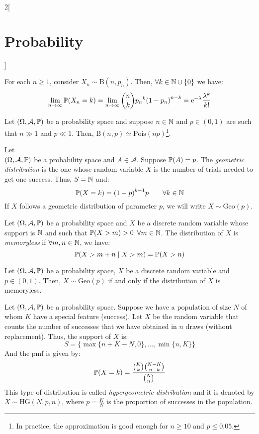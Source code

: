 \documentclass[../../../main.tex]{subfiles}
\begin{document}
\begin{multicols}{2}[\section{Probability}]
\begin{theorem}
    For each $n\geq 1$, consider $X_n\sim \text{B}(n,p_n)$. Then, $\forall k\in\mathbb{N}\cup\{0\}$ we have: $$\lim_{n\to\infty}\mathbb{P}(X_n=k)=\lim_{n\to\infty}\binom{n}{k}{p_n}^k{(1-p_n)}^{n-k}=\mathrm{e}^{-\lambda}\frac{\lambda^k}{k!}$$
  \end{theorem}
  \begin{corollary}
    Let $(\Omega,\mathcal{A},\mathbb{P})$ be a probability space and suppose $n\in\mathbb{N}$ and $p\in (0,1)$ are such that $n\gg 1$ and $p\ll 1$. Then, $\text{B}(n,p)\simeq\text{Pois}(np)$\footnote{In practice, the approximation is good enough for $n\geq 10$ and $p\leq 0.05$.}.
  \end{corollary}
  \begin{definition}
    Let\\ $(\Omega,\mathcal{A},\mathbb{P})$ be a probability space and $A\in\mathcal{A}$. Suppose $\mathbb{P}(A)=p$. The \textit{geometric distribution} is the one whose random variable $X$ is the number of trials needed to get one success. Thus, $S=\mathbb{N}$ and: $$\mathbb{P}(X=k)={(1-p)}^{k-1}p\qquad \forall k\in\mathbb{N}$$ If $X$ follows a geometric distribution of parameter $p$, we will write $X\sim \text{Geo}(p)$.
  \end{definition}
  \begin{definition}
    Let $(\Omega,\mathcal{A},\mathbb{P})$ be a probability space and $X$ be a discrete random variable whose support is $\mathbb{N}$ and such that $\mathbb{P}(X >m)>0$ $\forall m\in\mathbb{N}$. The distribution of $X$ is \textit{memoryless} if $\forall m,n\in\mathbb{N}$, we have: $$\mathbb{P}(X>m+n\mid X >m)=\mathbb{P}(X>n)$$
  \end{definition}
  \begin{prop}
    Let $(\Omega,\mathcal{A},\mathbb{P})$ be a probability space, $X$ be a discrete random variable and $p\in(0,1)$. Then, $X\sim\text{Geo}(p)$ if and only if the distribution of $X$ is memoryless.
  \end{prop}
  \begin{definition}
    Let $(\Omega,\mathcal{A},\mathbb{P})$ be a probability space. Suppose we have a population of size $N$ of whom $K$ have a special feature (success). Let $X$ be the random variable that counts the number of successes that we have obtained in $n$ draws (without replacement). Thus, the support of $X$ is: $$S=\{\max\{n+K-N,0\},\ldots,\min\{n,K\}\}$$ And the pmf is given by: $$\mathbb{P}(X=k)=\frac{\binom{K}{k}\binom{N-K}{n-k}}{\binom{N}{n}}$$ This type of distribution is called \textit{hypergeometric distribution} and it is denoted by $X\sim \text{HG}(N,p,n)$, where $p=\frac{K}{N}$ is the proportion of successes in the population.

\end{definition}
\end{multicols}
\end{document}
